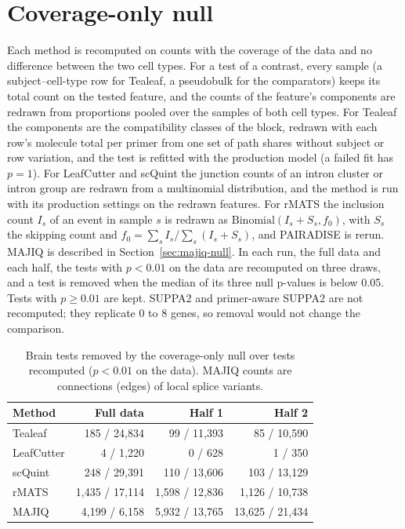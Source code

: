 \documentclass[11pt]{article}
\begin{document}
\section{Coverage-only null}
\label{sec:coverage-null}

Each method is recomputed on counts with the coverage of the data and no difference between the two cell types. For a test of a contrast, every sample (a subject--cell-type row for Tealeaf, a pseudobulk for the comparators) keeps its total count on the tested feature, and the counts of the feature's components are redrawn from proportions pooled over the samples of both cell types. For Tealeaf the components are the compatibility classes of the block, redrawn with each row's molecule total per primer from one set of path shares without subject or row variation, and the test is refitted with the production model (a failed fit has $p=1$). For LeafCutter and scQuint the junction counts of an intron cluster or intron group are redrawn from a multinomial distribution, and the method is run with its production settings on the redrawn features. For rMATS the inclusion count $I_s$ of an event in sample $s$ is redrawn as $\mathrm{Binomial}(I_s+S_s,f_0)$, with $S_s$ the skipping count and $f_0=\sum_s I_s/\sum_s(I_s+S_s)$, and PAIRADISE is rerun. MAJIQ is described in Section~\ref{sec:majiq-null}. In each run, the full data and each half, the tests with $p<0.01$ on the data are recomputed on three draws, and a test is removed when the median of its three null p-values is below 0.05. Tests with $p\ge0.01$ are kept. SUPPA2 and primer-aware SUPPA2 are not recomputed; they replicate 0 to 8 genes, so removal would not change the comparison.

\begin{table}[ht]
\centering
\small
\begin{tabular}{lrrr}
\toprule
Method & Full data & Half 1 & Half 2\\
\midrule
Tealeaf & 185 / 24{,}834 & 99 / 11{,}393 & 85 / 10{,}590\\
LeafCutter & 4 / 1{,}220 & 0 / 628 & 1 / 350\\
scQuint & 248 / 29{,}391 & 110 / 13{,}606 & 103 / 13{,}129\\
rMATS & 1{,}435 / 17{,}114 & 1{,}598 / 12{,}836 & 1{,}126 / 10{,}738\\
MAJIQ & 4{,}199 / 6{,}158 & 5{,}932 / 13{,}765 & 13{,}625 / 21{,}434\\
\bottomrule
\end{tabular}
\caption{Brain tests removed by the coverage-only null over tests recomputed ($p<0.01$ on the data). MAJIQ counts are connections (edges) of local splice variants.}
\label{tab:coverage-removed}
\end{table}
\end{document}

